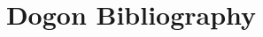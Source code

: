\documentclass[11pt]{article}
\title{Dogon Bibliography}
\begin{document}
\maketitle

\nocite{*}

  

\end{document}
